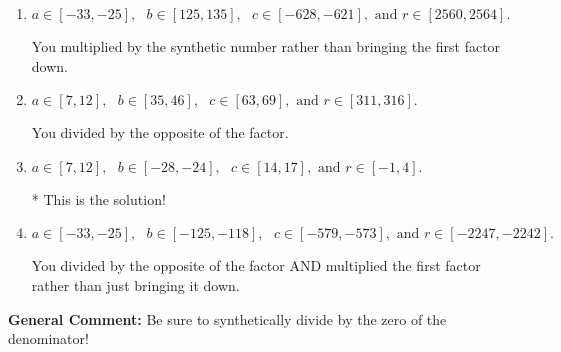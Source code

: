 \documentclass{extbook}[14pt]
\begin{document}
\begin{enumerate}
{\begin{enumerate}[label=\Alph*.]
 You multiplied by the synthetic number and subtracted rather than adding during synthetic division.
\item \( a \in [-33, -25], \text{   } b \in [125, 135], \text{   } c \in [-628, -621], \text{   and   } r \in [2560, 2564]. \)

 You multiplied by the synthetic number rather than bringing the first factor down.
\item \( a \in [7, 12], \text{   } b \in [35, 46], \text{   } c \in [63, 69], \text{   and   } r \in [311, 316]. \)

 You divided by the opposite of the factor.
\item \( a \in [7, 12], \text{   } b \in [-28, -24], \text{   } c \in [14, 17], \text{   and   } r \in [-1, 4]. \)

* This is the solution!
\item \( a \in [-33, -25], \text{   } b \in [-125, -118], \text{   } c \in [-579, -573], \text{   and   } r \in [-2247, -2242]. \)

 You divided by the opposite of the factor AND multiplied the first factor rather than just bringing it down.
\end{enumerate}

\textbf{General Comment:} Be sure to synthetically divide by the zero of the denominator!
}
\end{enumerate}
\end{document}
